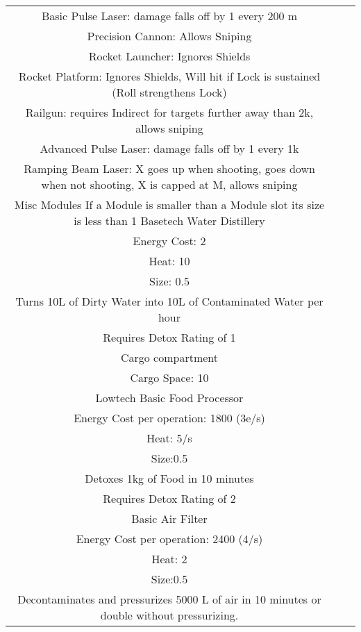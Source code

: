\documentclass{article}
\begin{document}
\begin{tabular}{c|c|c}
    Basic Pulse Laser: damage falls off by 1 every 200 m \\
    Precision Cannon: Allows Sniping \\
    Rocket Launcher: Ignores Shields \\
    Rocket Platform: Ignores Shields, Will hit if Lock is sustained (Roll strengthens Lock)\\
    Railgun: requires Indirect for targets further away than 2k, allows sniping\\
    Advanced Pulse Laser: damage falls off by 1 every 1k \\
    Ramping Beam Laser: X goes up when shooting, goes down when not shooting, X is capped at M, allows sniping\\


    Misc Modules\newline
    If a Module is smaller than a Module slot its size is less than 1
    \newline
    Basetech \newline
    Water Distillery \\
    Energy Cost: 2\\
    Heat: 10\\
    Size: 0.5\\
    Turns 10L of Dirty Water into 10L of Contaminated Water per hour\\
    Requires Detox Rating of 1\\
    \newline
    Cargo compartment\\
    Cargo Space: 10 \\
    \newline
    Lowtech \newline
    Basic Food Processor\\
    Energy Cost per operation: 1800 (3e/s)\\
    Heat: 5/s \\
    Size:0.5\\
    Detoxes 1kg of Food in 10 minutes \\
    Requires Detox Rating of 2\\
    \newline
    Basic Air Filter\\
    Energy Cost per operation: 2400 (4/s)\\
    Heat: 2\\
    Size:0.5\\
    Decontaminates and pressurizes 5000 L of air in  10 minutes or double without pressurizing. \\

\end{tabular}
\end{document}
